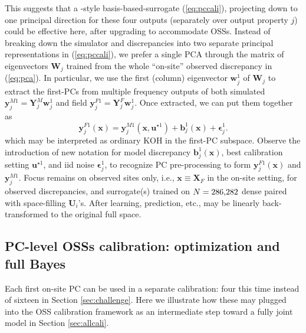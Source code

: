 \documentclass[12pt]{article}
\newcommand{\blunew}[1]{\textcolor{black}{#1}} %
\begin{document}
This suggests that a \citet{Higdon2008}-style basis-based-surrogate
(\ref{eq:pccali}), projecting down to one principal direction for these four
outputs (separately over output property $j$) could be effective here, after
upgrading to accommodate OSSs. Instead of breaking down the simulator and
discrepancies into two separate principal representations  in
(\ref{eq:pccali}), we prefer a single PCA through the matrix of eigenvectors
$\mathbf{W}_j$ trained from  the whole ``on-site'' observed discrepancy in
(\ref{eq:pca}). In particular, we  use the first (column) eigenvector
$\mathbf{w}^1_j$ of $\mathbf{W}_j$ to extract the first-PCs from multiple
frequency outputs of both simulated $\mathbf{y}_j^{M1} =
\mathbf{Y}_j^M
\mathbf{w}_j^1$ and field $\mathbf{y}_j^{F1} = \mathbf{Y}_j^F\mathbf{w}_j^1$.
Once extracted, we can put them together as 
\begin{equation}
\mathbf{y}_j^{F1}(\mathbf{x}) = \mathbf{y}_j^{M1} (\mathbf{x}, \mathbf{u}^{\star1})
 + \mathbf{b}^1_j(\mathbf{x})  + \mathbf{\epsilon}^1_j. 
  \label{eq:pckoh}
\end{equation}
which may be interpreted as ordinary KOH in the first-PC subspace. Observe the
introduction of new notation for model discrepancy
$\mathbf{b}^1_j(\mathbf{x})$, best calibration setting $\mathbf{u}^{\star1}$,
and iid noise $\mathbf{\epsilon}_j^1$, to recognize PC pre-processing to form
$\mathbf{y}_j^{F1}(\mathbf{x})$ and $\mathbf{y}_j^{M1}$. Focus remains on
observed sites only, i.e., $\mathbf{x} \equiv \mathbf{X}_F$ in the on-site setting,
for observed discrepancies, and surrogate(s) trained on $\blunew{N}= 286{,}282$ dense
paired with space-filling $\mathbf{U}_i$'s. After learning,
prediction, etc., may be linearly back-transformed to the
original full space.



\subsection{PC-level OSSs calibration: optimization and full Bayes}
\label{sec:pcacali}

Each first on-site PC can be used in a separate calibration: four this time
instead of sixteen in Section \ref{sec:challenge}.  
Here we illustrate how these may plugged into the OSS calibration framework as an
intermediate step toward a fully joint model in Section
\ref{sec:allcali}.  
\end{document}
